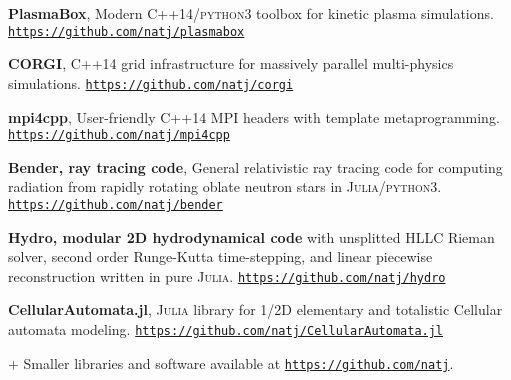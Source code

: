 \documentclass[10pt]{article}
\begin{document}
\vspace{-20pt}
\begin{thebibliography}{6}
\vspace{-5pt}
    \textbf{PlasmaBox}, 
\newblock Modern \textsc{C++}14/\textsc{python3} toolbox for kinetic plasma simulations. 
 \newblock \mbox{\href{https://github.com/natj/PlasmaBox}{\nolinkurl{https://github.com/natj/plasmabox}}}

    \textbf{CORGI}, 
 \newblock \textsc{C++}14 grid infrastructure for massively parallel multi-physics simulations. 
 \newblock \mbox{\href{https://github.com/natj/corgi}{\nolinkurl{https://github.com/natj/corgi}}} 

    \textbf{mpi4cpp}, 
\newblock User-friendly \textsc{C++}14 MPI headers with template metaprogramming. 
 \newblock \mbox{\href{https://github.com/natj/mpi4cpp}{\nolinkurl{https://github.com/natj/mpi4cpp}}}

    \textbf{Bender, ray tracing code}, 
        \newblock General relativistic ray tracing code for computing radiation from rapidly rotating oblate neutron stars in \textsc{Julia}/\textsc{python3}. 
 \newblock \mbox{\href{https://github.com/natj/bender}{\nolinkurl{https://github.com/natj/bender}}}

    \textbf{Hydro, modular 2D hydrodynamical code} 
\newblock with unsplitted HLLC Rieman solver, second order Runge-Kutta time-stepping, and linear piecewise reconstruction written in pure \textsc{Julia}.
 \newblock \mbox{\href{https://github.com/natj/hydro}{\nolinkurl{https://github.com/natj/hydro}}}

    \textbf{CellularAutomata.jl}, 
\newblock \textsc{Julia} library for 1/2D elementary and totalistic Cellular automata modeling. 
\newblock \mbox{\href{https://github.com/natj/CellularAutomata.jl}{\nolinkurl{https://github.com/natj/CellularAutomata.jl}}}
\end{thebibliography}

\noindent
$+$ Smaller libraries and software available at \mbox{\href{https://github.com/natj}{\nolinkurl{https://github.com/natj}}}.
\end{document}
